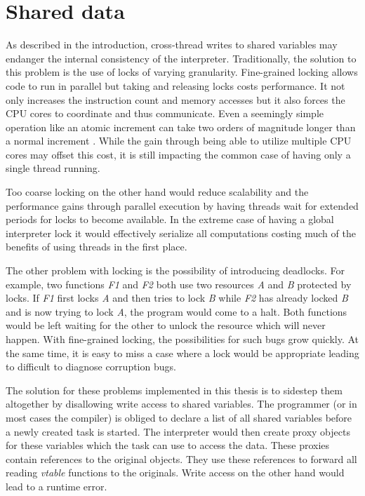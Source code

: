 \documentclass[bachelor,english]{hgbthesis}
\begin{document}
\section{Shared data}

As described in the introduction, cross-thread writes to shared variables may endanger the internal consistency of the interpreter. Traditionally, the solution to this problem is the use of locks of varying granularity. Fine-grained locking allows code to run in parallel but taking and releasing locks costs performance. It not only increases the instruction count and memory accesses but it also forces the CPU cores to coordinate and thus communicate. Even a seemingly simple operation like an atomic increment can take two orders of magnitude longer than a normal increment \cite{LockingInOSKernels}. While the gain through being able to utilize multiple CPU cores may offset this cost, it is still impacting the common case of having only a single thread running.

Too coarse locking on the other hand would reduce scalability and the performance gains through parallel execution by having threads wait for extended periods for locks to become available. In the extreme case of having a global interpreter lock it would effectively serialize all computations costing much of the benefits of using threads in the first place.

The other problem with locking is the possibility of introducing deadlocks. For example, two functions \textit{F1} and \textit{F2} both use two resources \textit{A} and \textit{B} protected by locks. If \textit{F1} first locks \textit{A} and then tries to lock \textit{B} while \textit{F2} has already locked \textit{B} and is now trying to lock \textit{A}, the program would come to a halt. Both functions would be left waiting for the other to unlock the resource which will never happen. With fine-grained locking, the possibilities for such bugs grow quickly. At the same time, it is easy to miss a case where a lock would be appropriate leading to difficult to diagnose corruption bugs.

The solution for these problems implemented in this thesis is to sidestep them altogether by disallowing write access to shared variables. The programmer (or in most cases the compiler) is obliged to declare a list of all shared variables before a newly created task is started. The interpreter would then create proxy objects for these variables which the task can use to access the data. These proxies contain references to the original objects. They use these references to forward all reading \textit{vtable} functions to the originals. Write access on the other hand would lead to a runtime error.
\end{document}
